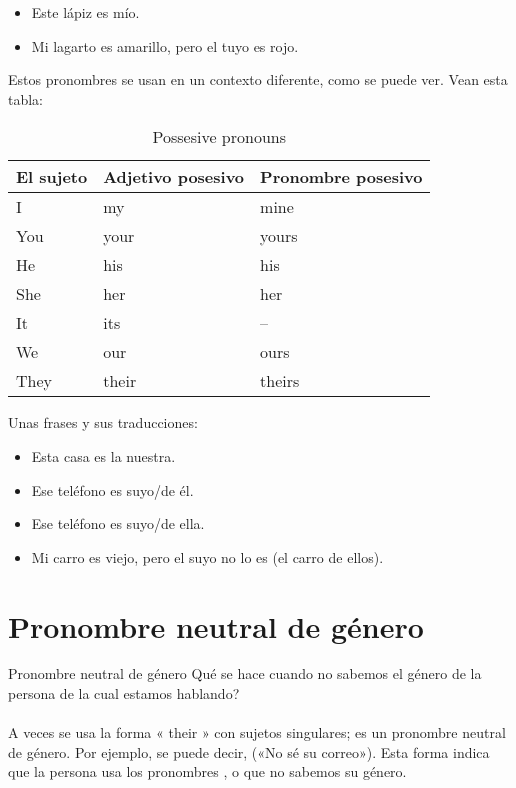 \begin{itemize}
	\item Este l\'apiz es m\'io.
		\arr {}
	\item Mi lagarto es amarillo, pero el tuyo es rojo.
		\arr {}
\end{itemize}

Estos pronombres se usan en un contexto diferente, como se puede ver.
Vean esta tabla:

\begin{table}[H]
	\centering
	\begin{tabular}{lll}
	\toprule
	\textbf{El sujeto} & \textbf{Adjetivo posesivo} & \textbf{Pronombre posesivo} \\
	\midrule
	I & my & mine \\
	You & your & yours \\
	He & his & his \\
	She & her & her \\
	It & its & -- \\
	We & our & ours\\
	They & their & theirs \\
	\bottomrule
	\end{tabular}
	\caption{Possesive pronouns}
\end{table}

Unas frases y sus traducciones:
\begin{itemize}
	\item Esta casa es la nuestra.
		\arr {}
	\item Ese tel\'efono es suyo/de \'el.
		\arr {}
	\item Ese tel\'efono es suyo/de ella.
		\arr {}
	\item Mi carro es viejo, pero el suyo no lo es (el carro de ellos).
		\arr {}
\end{itemize}

\section{Pronombre neutral de g\'enero}
\begin{conf}{Pronombre neutral de g\'enero}
\textquestiondown Qu\'e se hace cuando no sabemos el g\'enero de la persona de
la cual estamos hablando? \\
\\
A veces se usa la forma « their » con sujetos singulares; es un pronombre neutral
de g\'enero.
Por ejemplo, se puede decir,  («No sé su correo»).
Esta forma indica que la persona usa los pronombres , o que
no sabemos su g\'enero.
\end{conf}


